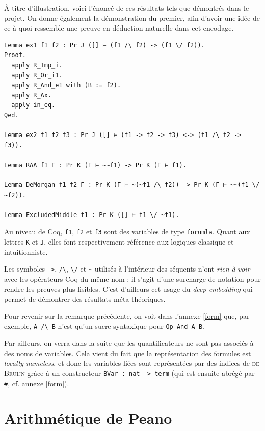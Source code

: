 \documentclass[a4paper]{article}
\begin{document}
\`A titre d'illustration, voici l'énoncé de ces résultats tels que démontrés dans le projet. On donne également la démonstration du premier, afin d'avoir une idée de ce à quoi ressemble une preuve en déduction naturelle dans cet encodage.
\begin{verbatim}
Lemma ex1 f1 f2 : Pr J ([] ⊢ (f1 /\ f2) -> (f1 \/ f2)).
Proof.
  apply R_Imp_i.
  apply R_Or_i1.
  apply R_And_e1 with (B := f2).
  apply R_Ax.
  apply in_eq.
Qed.

Lemma ex2 f1 f2 f3 : Pr J ([] ⊢ (f1 -> f2 -> f3) <-> (f1 /\ f2 -> f3)).

Lemma RAA f1 Γ : Pr K (Γ ⊢ ~~f1) -> Pr K (Γ ⊢ f1).

Lemma DeMorgan f1 f2 Γ : Pr K (Γ ⊢ ~(~f1 /\ f2)) -> Pr K (Γ ⊢ ~~(f1 \/ ~f2)).

Lemma ExcludedMiddle f1 : Pr K ([] ⊢ f1 \/ ~f1).
\end{verbatim}
Au niveau de Coq, \verb+f1+, \verb+f2+ et \verb+f3+ sont des variables de type \verb+forumla+. Quant aux lettres \verb+K+ et \verb+J+, elles font respectivement référence aux logiques classique et intuitionniste.
\smallskip

\noindent \begin{minipage}[t]{0.05\linewidth}
\dbend
\end{minipage} \begin{minipage}[c]{0.95\linewidth}
Les symboles \verb+->+, \verb+/\+, \verb+\/+ et \verb+~+ utilisés à l'intérieur des séquents n'ont \emph{rien à voir} avec les opérateurs Coq du même nom : il s'agit d'une surcharge de notation pour rendre les preuves plus lisibles. C'est d'ailleurs cet usage du \emph{deep-embedding} qui permet de démontrer des résultats méta-théoriques.
\end{minipage}
\smallskip

Pour revenir sur la remarque précédente, on voit dans l'annexe \ref{form} que, par exemple, \verb+A /\ B+ n'est qu'un sucre syntaxique pour \verb+Op And A B+.

Par ailleurs, on verra dans la suite que les quantificateurs ne sont pas associés à des noms de variables. Cela vient du fait que la représentation des formules est \emph{locally-nameless}, et donc les variables liées sont représentées par des indices de \textsc{de Bruijn} grâce à un constructeur \verb+BVar : nat -> term+ (qui est ensuite abrégé par \verb+#+, cf. annexe \ref{form}).

\newpage


\section{Arithmétique de {\sc Peano}}
\end{document}

